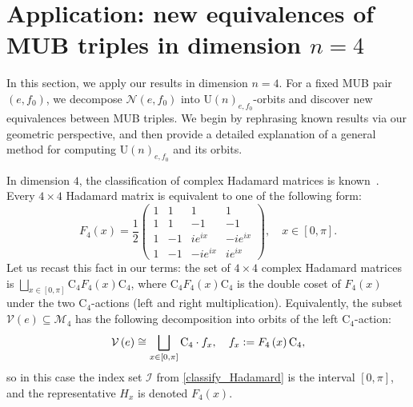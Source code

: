 \documentclass[referee,sn-mathphys-num]{sn-jnl}%
\theoremstyle{thmstyleone}%
\theoremstyle{thmstyletwo}%
\theoremstyle{remark}
\theoremstyle{thmstylethree}%
\newcommand{\defeq}{\vcentcolon=}
\begin{document}
\section{Application: new equivalences of MUB triples in dimension $n=4$}\label{sec:app}
In this section, we apply our results in dimension $n=4$. For a fixed MUB pair $ \left( e, f_0 \right) $, we decompose $ \mathcal{N} \left( e, f_0 \right) $ into $ \mathrm{U} \left( n \right)_{e, f_0} $-orbits and discover new equivalences between MUB triples. We begin by rephrasing known results via our geometric perspective, and then provide a detailed explanation of a general method for computing $ \mathrm{U} \left( n \right)_{e, f_0} $ and its orbits.

In dimension $4$, the classification of complex Hadamard matrices is known~\cite{brierley2009all}. Every $ 4 \times 4 $ Hadamard matrix is equivalent to one of the following form:
	\begin{equation}
		F_4 \left( x \right) = \frac{1}{2} \begin{pmatrix}
			1 & 1 & 1 & 1 \\
			1 & 1 & -1 & -1 \\
			1 & -1 & i e^{i x} & -i e^{i x} \\
			1 & -1 & -i e^{i x} & i e^{i x}
		\end{pmatrix} , \quad x \in \left[ 0, \pi \right] .
	\end{equation}
	Let us recast this fact in our terms: the set of $ 4 \times 4 $ complex Hadamard matrices is $ \bigsqcup_{x \in \left[ 0, \pi \right] } \mathrm{C}_4 F_4 \left( x \right) \mathrm{C}_4 $, where $ \mathrm{C}_4 F_4 \left( x \right) \mathrm{C}_4 $ is the double coset of $ F_4 \left( x \right) $ under the two $ \mathrm{C}_4 $-actions (left and right multiplication).
	Equivalently, the subset $ \mathcal{V} \left( e \right) \subseteq \mathcal{M}_4 $ has the following decomposition into orbits of the left $ \mathrm{C}_4 $-action:
	\begin{equation}
		\mathcal{V} \left( e \right) \cong \bigsqcup_{x \in \left[ 0, \pi \right] } \mathrm{C}_4 \cdot f_x , \quad f_x \defeq F_4 \left( x \right) \mathrm{C}_4 ,
	\end{equation}
	so in this case the index set $ \mathcal{I} $ from \eqref{classify_Hadamard} is the interval $ \left[ 0, \pi \right]$, and the representative $ H_x $ is denoted $ F_4 \left( x \right) $.
	
\end{document}
